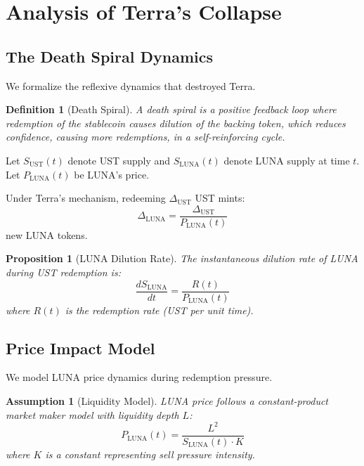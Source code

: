 \documentclass[11pt,a4paper]{article}
\newtheorem{proposition}[theorem]{Proposition}
\newtheorem{definition}[theorem]{Definition}
\newtheorem{assumption}[theorem]{Assumption}
\begin{document}
\section{Analysis of Terra's Collapse}
\label{sec:terraanalysis}

\subsection{The Death Spiral Dynamics}

We formalize the reflexive dynamics that destroyed Terra.

\begin{definition}[Death Spiral]
A death spiral is a positive feedback loop where redemption of the stablecoin causes dilution of the backing token, which reduces confidence, causing more redemptions, in a self-reinforcing cycle.
\end{definition}

Let $S_{\text{UST}}(t)$ denote UST supply and $S_{\text{LUNA}}(t)$ denote LUNA supply at time $t$. Let $P_{\text{LUNA}}(t)$ be LUNA's price.

Under Terra's mechanism, redeeming $\Delta_{\text{UST}}$ UST mints:
\begin{equation}
\Delta_{\text{LUNA}} = \frac{\Delta_{\text{UST}}}{P_{\text{LUNA}}(t)}
\end{equation}
new LUNA tokens.

\begin{proposition}[LUNA Dilution Rate]
The instantaneous dilution rate of LUNA during UST redemption is:
\begin{equation}
\frac{dS_{\text{LUNA}}}{dt} = \frac{R(t)}{P_{\text{LUNA}}(t)}
\end{equation}
where $R(t)$ is the redemption rate (UST per unit time).
\end{proposition}

\subsection{Price Impact Model}

We model LUNA price dynamics during redemption pressure.

\begin{assumption}[Liquidity Model]
LUNA price follows a constant-product market maker model with liquidity depth $L$:
\begin{equation}
P_{\text{LUNA}}(t) = \frac{L^2}{S_{\text{LUNA}}(t) \cdot K}
\end{equation}
where $K$ is a constant representing sell pressure intensity.
\end{assumption}
\end{document}
